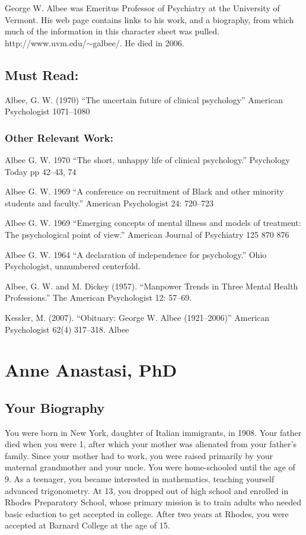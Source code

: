 George W. Albee was Emeritus Professor of Psychiatry at the University of Vermont. His web page contains links to his work, and a biography, from which much of the information in this character sheet was pulled. http:\slash \slash www.uvm.edu\slash \ensuremath{\sim}galbee\slash . He died in 2006.

\section{Must Read:}
\label{mustread:}

Albee, G. W. (1970) “The uncertain future of clinical psychology” American Psychologist 1071--1080

\subsection{Other Relevant Work:}
\label{otherrelevantwork:}

Albee G. W. 1970 “The short, unhappy life of clinical psychology.” Psychology Today pp 42--43, 74

Albee G. W. 1969 “A conference on recruitment of Black and other minority students and faculty.” American Psychologist 24: 720--723

Albee G. W. 1969 “Emerging concepts of mental illness and models of treatment: The psychological point of view.” American Journal of Psychiatry 125 870 876

Albee G. W. 1964 “A declaration of independence for psychology.” Ohio Psychologist, unnumbered centerfold.

Albee, G. W. and M. Dickey (1957). ``Manpower Trends in Three Mental Health Professions.'' The American Psychologist 12: 57--69.

Kessler, M. (2007). “Obituary: George W. Albee (1921--2006)” American Psychologist 62(4) 317--318.
Albee

\chapter{Anne Anastasi, PhD}
\label{anneanastasiphd}

\section{Your Biography}
\label{yourbiography}

You were born in New York, daughter of Italian immigrants, in 1908. Your father died when you were 1, after which your mother was alienated from your father's family. Since your mother had to work, you were raised primarily by your maternal grandmother and your uncle. You were home-schooled until the age of 9. As a teenager, you became interested in mathematics, teaching yourself advanced trigonometry. At 13, you dropped out of high school and enrolled in Rhodes Preparatory School, whose primary mission is to train adults who needed basic eduction to get accepted in college. After two years at Rhodes, you were accepted at Barnard College at the age of 15.


